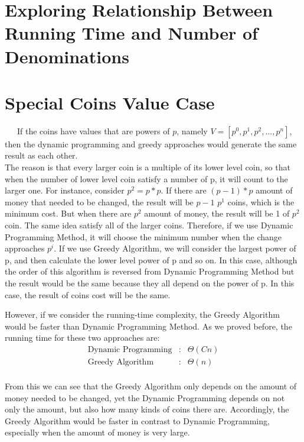 \documentclass[11pt]{scrreprt}
\begin{document}
\section{Exploring Relationship Between Running Time and Number of Denominations}

\section{Special Coins Value Case}

\ \ \ If the coins have values that are powers of $p$, namely $V = [p^0 , p^1 , p^2 , ... , p^n]$, then the dynamic programming and greedy approaches would generate the same result as each other.\\

The reason is that every larger coin is a multiple of its lower level coin, so that when the number of lower level coin satisfy a number of p, it will count to the larger one. For instance, consider $p^2 = p*p$. If there are $(p-1)*p$ amount of money that needed to be changed, the result will be $p-1$ $p^1$ coins, which is the minimum cost. But when there are $p^2$ amount of money, the result will be 1 of $p^2$ coin. The same idea satisfy all of the larger coins. Therefore, if we use Dynamic Programming Method, it will choose the minimum number when the change approaches $p^i$. If we use Greedy Algorithm, we will consider the largest power of p, and then calculate the lower level power of p and so on. In this case, although the order of this algorithm is reversed from Dynamic Programming Method but the result would be the same because they all depend on the power of p. In this case, the result of coins cost will be the same.

However, if we consider the running-time complexity, the Greedy Algorithm would be faster than Dynamic Programming Method. As we proved before, the running time for these two approaches are:
\begin{eqnarray*}
\mbox{Dynamic Programming}&:& \Theta(Cn)\\
\mbox{Greedy Algorithm}&:& \Theta(n)\\
\end{eqnarray*}

From this we can see that the Greedy Algorithm only depends on the amount of money needed to be changed, yet the Dynamic Programming depends on not only the amount, but also how many kinds of coins there are. Accordingly, the Greedy Algorithm would be faster in contrast to Dynamic Programming, especially when the amount of money is very large.
\end{document}
